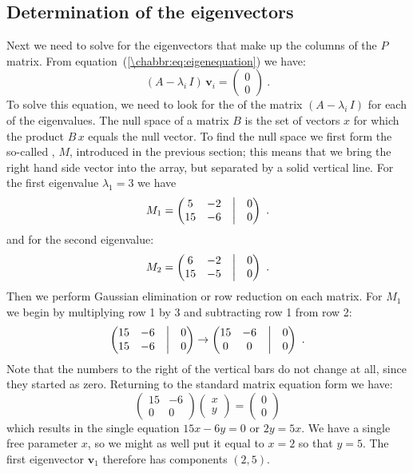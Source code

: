 \subsection{Determination of the eigenvectors}
Next we need to solve for the eigenvectors that make up the columns of the $P$ matrix.  From equation~(\ref{\chabbr:eq:eigenequation}) we have:
\[
	(A-\lambda_i\, I)\,\mathbf{v}_i = \begin{pmatrix}0\\ 0\end{pmatrix}\ .
\] 
To solve this equation, we need to look for the  of the matrix $(A-\lambda_i\, I)$ for each of the eigenvalues.  The null space of a matrix $B$ is the set  of vectors $x$ for which the product $B\,x$ equals the null vector.  To find the null space we first form the so-called , $M$, introduced in the previous section; this means that we bring the right hand side vector into the array, but separated by a solid vertical line. For the first eigenvalue $\lambda_1=3$ we have
\[
	M_1 = \begin{pmatrix}
	5 &-2 & \bigm|& 0\\ 
	15& -6 & \bigm|& 0 \end{pmatrix}\ .
\]
and for the second eigenvalue:
\[
	M_2 = \begin{pmatrix}
	6 &-2 & \bigm|& 0\\ 
	15& -5 & \bigm|& 0 \end{pmatrix}\ .
\]
Then we perform Gaussian elimination or row reduction on each matrix. For $M_1$ we begin by multiplying row 1 by $3$ and subtracting row 1 from row 2:
\[
	\begin{pmatrix}
	15 & -6 & \bigm|& 0\\ 
	15 & -6 & \bigm|& 0 \end{pmatrix}	\rightarrow 
	\begin{pmatrix}
	15 & -6 & \bigm|& 0\\ 
	0 &  0 & \bigm|& 0 \end{pmatrix}\ .
\]
Note that the numbers to the right of the vertical bars do not change at all, since they started as zero. Returning to the standard matrix equation form we have:
\[
	\begin{pmatrix}
	15 & -6 \\ 
	0 &  0  \end{pmatrix} \begin{pmatrix}x\\ y\end{pmatrix} = \begin{pmatrix}0\\ 0\end{pmatrix}
\]
which results in the single equation $15x-6y=0$ or $2y=5x$.  We have a single free parameter $x$, so we might as well put it equal to $x=2$ so that $y=5$.   The first eigenvector $\mathbf{v}_1$ therefore has components $(2,5)$.


